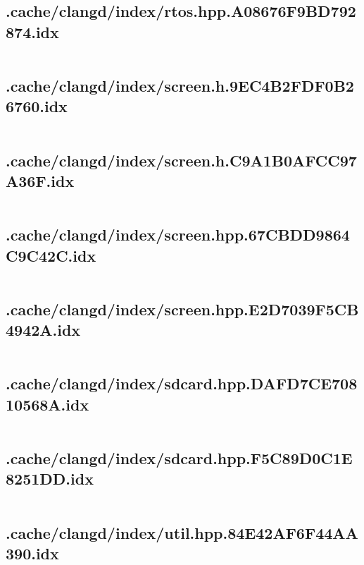 \subsection{.cache/clangd/index/rtos.hpp.A08676F9BD792874.idx}
\inputminted[linenos,tabsize=2,breaklines, breakanywhere]{c}{rtos.hpp.A08676F9BD792874.idx}
\pagebreak

\subsection{.cache/clangd/index/screen.h.9EC4B2FDF0B26760.idx}
\inputminted[linenos,tabsize=2,breaklines, breakanywhere]{c}{screen.h.9EC4B2FDF0B26760.idx}
\pagebreak

\subsection{.cache/clangd/index/screen.h.C9A1B0AFCC97A36F.idx}
\inputminted[linenos,tabsize=2,breaklines, breakanywhere]{c}{screen.h.C9A1B0AFCC97A36F.idx}
\pagebreak

\subsection{.cache/clangd/index/screen.hpp.67CBDD9864C9C42C.idx}
\inputminted[linenos,tabsize=2,breaklines, breakanywhere]{c}{screen.hpp.67CBDD9864C9C42C.idx}
\pagebreak

\subsection{.cache/clangd/index/screen.hpp.E2D7039F5CB4942A.idx}
\inputminted[linenos,tabsize=2,breaklines, breakanywhere]{c}{screen.hpp.E2D7039F5CB4942A.idx}
\pagebreak

\subsection{.cache/clangd/index/sdcard.hpp.DAFD7CE70810568A.idx}
\inputminted[linenos,tabsize=2,breaklines, breakanywhere]{c}{sdcard.hpp.DAFD7CE70810568A.idx}
\pagebreak

\subsection{.cache/clangd/index/sdcard.hpp.F5C89D0C1E8251DD.idx}
\inputminted[linenos,tabsize=2,breaklines, breakanywhere]{c}{sdcard.hpp.F5C89D0C1E8251DD.idx}
\pagebreak

\subsection{.cache/clangd/index/util.hpp.84E42AF6F44AA390.idx}
\inputminted[linenos,tabsize=2,breaklines, breakanywhere]{c}{util.hpp.84E42AF6F44AA390.idx}
\pagebreak

